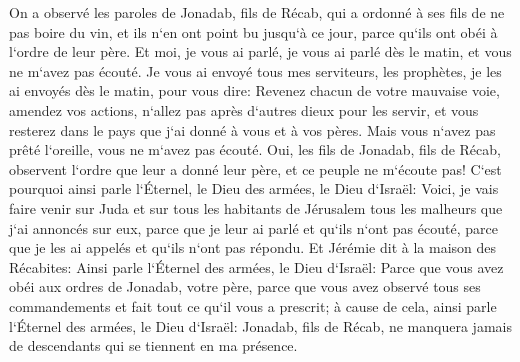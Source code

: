\verse On a observé les paroles de Jonadab, fils de Récab, qui a ordonné à ses fils de ne pas boire du vin, et ils n`en ont point bu jusqu`à ce jour, parce qu`ils ont obéi à l`ordre de leur père. Et moi, je vous ai parlé, je vous ai parlé dès le matin, et vous ne m`avez pas écouté. 
\verse Je vous ai envoyé tous mes serviteurs, les prophètes, je les ai envoyés dès le matin, pour vous dire: Revenez chacun de votre mauvaise voie, amendez vos actions, n`allez pas après d`autres dieux pour les servir, et vous resterez dans le pays que j`ai donné à vous et à vos pères. Mais vous n`avez pas prêté l`oreille, vous ne m`avez pas écouté. 
\verse Oui, les fils de Jonadab, fils de Récab, observent l`ordre que leur a donné leur père, et ce peuple ne m`écoute pas! 
\verse C`est pourquoi ainsi parle l`Éternel, le Dieu des armées, le Dieu d`Israël: Voici, je vais faire venir sur Juda et sur tous les habitants de Jérusalem tous les malheurs que j`ai annoncés sur eux, parce que je leur ai parlé et qu`ils n`ont pas écouté, parce que je les ai appelés et qu`ils n`ont pas répondu. 
\verse Et Jérémie dit à la maison des Récabites: Ainsi parle l`Éternel des armées, le Dieu d`Israël: Parce que vous avez obéi aux ordres de Jonadab, votre père, parce que vous avez observé tous ses commandements et fait tout ce qu`il vous a prescrit; 
\verse à cause de cela, ainsi parle l`Éternel des armées, le Dieu d`Israël: Jonadab, fils de Récab, ne manquera jamais de descendants qui se tiennent en ma présence. 

